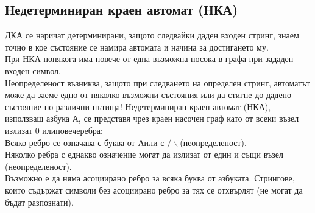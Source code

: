 \documentclass[fleqn, 12pt]{article}
\theoremstyle{definition}
\begin{document}
\subsection{Недетерминиран краен автомат (НКА)}
ДКА  се наричат детерминирани, защото следвайки даден входен стринг, знаем точно в кое състояние се намира автомата и начина за достигането му.\\
При НКА понякога има повече от една възможна посока в графа при зададен входен символ.\\
Неопределеност възниква, защото при следването на определен стринг, автоматът може да заеме едно от няколко възможни състояния или да стигне до дадено състояние по различни пътища!
Недетерминиран краен автомат (НКА), използващ азбука А, се представя чрез краен насочен граф като от всеки възел излизат 0 илиповечеребра:\\
Всяко ребро се означава с буква от Аили с $/\backslash$(неопределеност).\\
Няколко ребра с еднакво означение могат да излизат от един и същи възел (неопределеност).\\
Възможно е да няма асоциирано ребро за всяка буква от азбуката. Стрингове, които съдържат символи без асоциирано ребро за тях се отхвърлят (не могат да бъдат разпознати).
\end{document}
